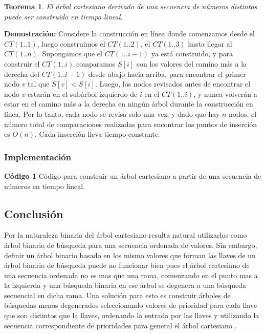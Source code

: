 \documentclass[12pt]{article}
\newcommand{\proof}{\textbf{Demostración:} }
\newcommand{\nl}{\vspace{0.3cm}}
\newcommand{\ct}{árbol cartesiano }
\newtheorem{theorem}{Teorema}
\begin{document}
\begin{theorem}
	El \ct derivado de una secuencia de números distintos puede ser construido en tiempo lineal.
\end{theorem}

\proof Considere la construcción en línea donde comenzamos desde el $CT(1..1)$, luego construimos el $CT(1..2)$, el $CT(1..3)$ hasta llegar al $CT(1..n)$. Supongamos que el $CT(1..i-1)$ ya está construido, y para construir el $CT(1..i)$ comparamos $S[i]$ con los valores del camino más a la derecha del $CT(1..i-1)$ desde abajo hacia arriba, para encontrar el primer nodo $v$ tal que $S[v] < S[i]$. Luego, los nodos revisados antes de encontrar el nodo $v$ estarán en el subárbol izquierdo de $i$ en el $CT(1..i)$, y nunca volverán a estar en el camino más a la derecha en ningún árbol durante la construcción en línea. Por lo tanto, cada nodo se revisa solo una vez, y dado que hay $n$ nodos, el número total de comparaciones realizadas para encontrar los puntos de inserción es $O(n)$. Cada inserción lleva tiempo constante.

\nl

\subsubsection{Implementación}

\nl

\textbf{Código 1} Código para construir un \ct a partir de una secuencia de números en tiempo lineal.



\subsection{Conclusión}

\nl

Por la naturaleza binaria del \ct resulta natural utilizarlos como árbol binario de búsqueda para una secuencia ordenada de valores. Sin embargo, definir un árbol binario basado en los mismo valores que forman las llaves de un árbol binario de búsqueda puede no funcionar bien pues el \ct de una secuencia ordenada no es mas que una rama, comenzando en el punto mas a la izquierda y una búsqueda binaria en ese árbol se degenera a una búsqueda secuencial en dicha rama. Una solución para esto es construir árboles de búsquedas menos degenerados seleccionando valores de prioridad para cada llave que son distintos que la llaves, ordenando la entrada por las llaves y utilizando la secuencia correspondiente de prioridades para general el \ct.\\
\end{document}
